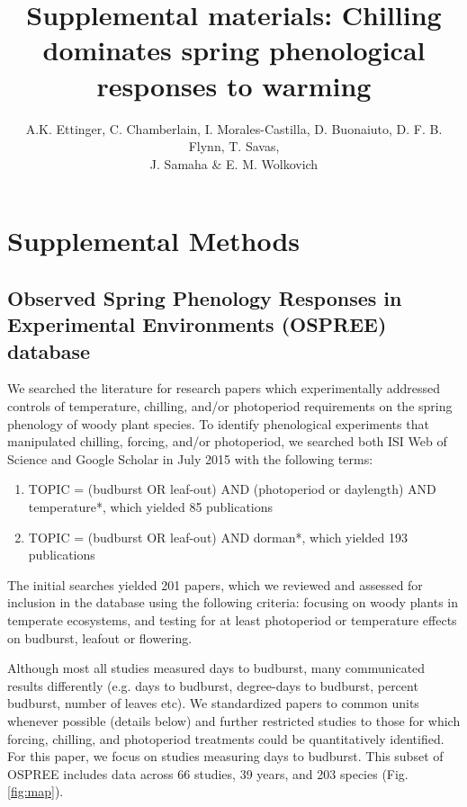 \documentclass{article}
\begin{document}
\title{Supplemental materials:  Chilling dominates spring phenological responses to warming} 

\author{A.K. Ettinger, C. Chamberlain, I. Morales-Castilla, D. Buonaiuto, D. F. B. Flynn, T. Savas, \\J. Samaha \& E. M. Wolkovich}
\maketitle  %
\renewcommand{\thetable}{S\arabic{table}}
\renewcommand{\thefigure}{S\arabic{figure}}

\section*{Supplemental Methods}

\subsection*{Observed Spring Phenology Responses in Experimental Environments (OSPREE) database}
\par We searched the literature for research papers which experimentally addressed
controls of temperature, chilling, and/or photoperiod requirements on the spring
phenology of woody plant species. To identify phenological experiments that manipulated chilling, forcing, and/or photoperiod, we searched both ISI Web of Science and Google Scholar in July 2015 with the following terms: 
\begin{enumerate}
\item TOPIC = (budburst OR leaf-out) AND (photoperiod or daylength) AND temperature*, which yielded 85 publications

\item TOPIC = (budburst OR leaf-out) AND dorman*, which yielded 193 publications
\end{enumerate}



The initial searches yielded 201 papers, which we reviewed and assessed for inclusion in the database using the following criteria: focusing on woody plants in temperate ecosystems, and testing for at least photoperiod or temperature effects on budburst, leafout or 
flowering. 
\par Although most all studies measured days to budburst, many communicated results differently (e.g. days to budburst, degree-days to budburst, percent budburst,
number of leaves etc). We standardized papers to common units whenever possible (details below) and further restricted studies to those for which forcing, chilling, and photoperiod treatments could be quantitatively identified. For this paper, we focus on studies measuring days to budburst. This subset of OSPREE includes data across 66 studies, 39 years, and 203 species (Fig. \ref{fig:map}).
\end{document}

